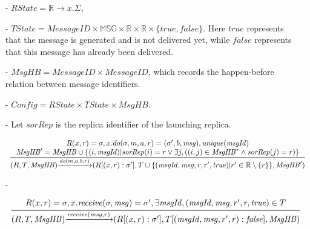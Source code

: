 \begin{itemize}
\setlength{\itemsep}{0.5pt}
\item[-] $\mathit{RState} = \mathbb{R} \rightarrow x.\Sigma$,

\item[-] $\mathit{TState} = \mathit{MessageID} \times \mathbb{MSG} \times \mathbb{R} \times \mathbb{R} \times \{ \mathit{true},\mathit{false} \}$. Here $\mathit{true}$ represents that the message is generated and is not delivered yet, while $\mathit{false}$ represents that this message has already been delivered.

\item[-] $\mathit{MsgHB} = \mathit{MessageID} \times \mathit{MessageID}$, which records the happen-before relation between message identifiers.

\item[-] $\mathit{Config} = \mathit{RState} \times \mathit{TState} \times \mathit{MsgHB}$.

\item[-] Let $\mathit{sorRep}$ is the replica identifier of the launching replica.

$\begin{array}{l c}
   \bigfrac{
   \begin{array}{c}
     R(x,r) = \sigma, x.\mathit{do}(\sigma,m,a,r) = (\sigma',b,\mathit{msg}), \mathit{unique}(\mathit{msgId})\\
     \mathit{MsgHB}' = \mathit{MsgHB} \cup \{ (i,\mathit{msgId}) \vert \mathit{sorRep}(i) = r \vee \exists j, ( (i,j) \in \mathit{MsgHB}^* \wedge \mathit{sorRep}(j) = r) \}
   \end{array}}
     {(R,T,\mathit{MsgHB}) {\xrightarrow{\mathit{do}(m,a,b,r)}} (R[(x,r):\sigma'],T \cup \{ (\mathit{msgId},\mathit{msg},r,r',\mathit{true}) \vert r' \in \mathbb{R} \setminus \{ r \} \},\mathit{MsgHB}')}
\end{array}$

\item[-]

$\begin{array}{l c}
   \bigfrac{
   \begin{array}{c}
      R(x,r) = \sigma, x.\mathit{receive}(\sigma,\mathit{msg}) = \sigma',\exists \mathit{msgId},(\mathit{msgId},\mathit{msg},r',r,\mathit{true}) \in T
   \end{array}}
     {(R,T,\mathit{MsgHB}) {\xrightarrow{\mathit{receive}(\mathit{msg},r)}} (R[(x,r):\sigma'],T[(\mathit{msgId},\mathit{msg},r',r):\mathit{false}],\mathit{MsgHB})}
\end{array}$
\end{itemize}


